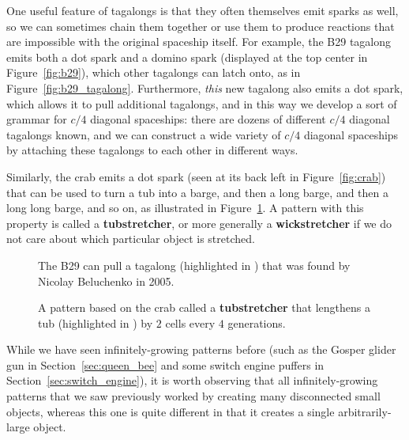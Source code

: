 One useful feature of tagalongs is that they often themselves emit sparks as well, so we can sometimes chain them together or use them to produce reactions that are impossible with the original spaceship itself. For example, the B29 tagalong emits both a dot spark and a domino spark (displayed at the top center in Figure~\ref{fig:b29}), which other tagalongs can latch onto, as in Figure~\ref{fig:b29_tagalong}. Furthermore, \emph{this} new tagalong also emits a dot spark, which allows it to pull additional tagalongs, and in this way we develop a sort of grammar for $c/4$ diagonal spaceships: there are dozens of different $c/4$ diagonal tagalongs known, and we can construct a wide variety of $c/4$ diagonal spaceships by attaching these tagalongs to each other in different ways.

Similarly, the crab emits a dot spark (seen at its back left in Figure~\ref{fig:crab}) that can be used to turn a tub into a barge, and then a long barge, and then a long long barge, and so on, as illustrated in Figure~\ref{fig:tubstretcher}. A pattern with this property is called a \textbf{tubstretcher}, or more generally a \textbf{wickstretcher} if we do not care about which particular object is stretched.

\begin{figure}[!htb]
	\centering
	\begin{minipage}[b]{.37\textwidth}
		\centering
		\caption{The B29 can pull a tagalong (highlighted in ) that was found by Nicolay Beluchenko in 2005.}\label{fig:b29_tagalong}
	\end{minipage} \hfill %
	\begin{minipage}[b]{.59\textwidth}
		\centering
		\caption{A pattern based on the crab called a \textbf{tubstretcher} that lengthens a tub (highlighted in ) by $2$ cells every $4$ generations.}\label{fig:tubstretcher}
	\end{minipage}
\end{figure}

While we have seen infinitely-growing patterns before (such as the Gosper glider gun in Section~\ref{sec:queen_bee} and some switch engine puffers in Section~\ref{sec:switch_engine}), it is worth observing that all infinitely-growing patterns that we saw previously worked by creating many disconnected small objects, whereas this one is quite different in that it creates a single arbitrarily-large object.



